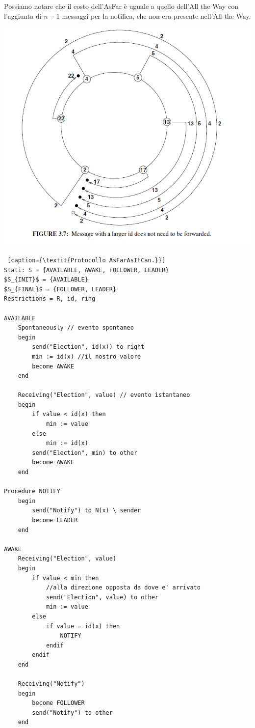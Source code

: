 Possiamo notare che il costo dell'AsFar è uguale a quello dell'All the Way con
l'aggiunta di $n-1$ messaggi per la notifica, che non era presente nell'All the
Way.

\begin{center}
    \includegraphics[scale=0.5]{images/asFar.png}
\end{center}

\newpage
\begin{lstlisting} [caption={\textit{Protocollo AsFarAsItCan.}}]
Stati: S = {AVAILABLE, AWAKE, FOLLOWER, LEADER}
$S_{INIT}$ = {AVAILABLE}
$S_{FINAL}$ = {FOLLOWER, LEADER}
Restrictions = R, id, ring

AVAILABLE
    Spontaneously // evento spontaneo
    begin
        send("Election", id(x)) to right
        min := id(x) //il nostro valore
        become AWAKE
    end
    
    Receiving("Election", value) // evento istantaneo
    begin
        if value < id(x) then
            min := value
        else
            min := id(x)
        send("Election", min) to other
        become AWAKE
    end

Procedure NOTIFY
    begin
        send("Notify") to N(x) \ sender
        become LEADER
    end

AWAKE
    Receiving("Election", value)
    begin
        if value < min then
            //alla direzione opposta da dove e' arrivato
            send("Election", value) to other 
            min := value
        else
            if value = id(x) then 
                NOTIFY
            endif
        endif
    end
    
    Receiving("Notify")
    begin
        become FOLLOWER
        send("Notify") to other
    end
\end{lstlisting}

